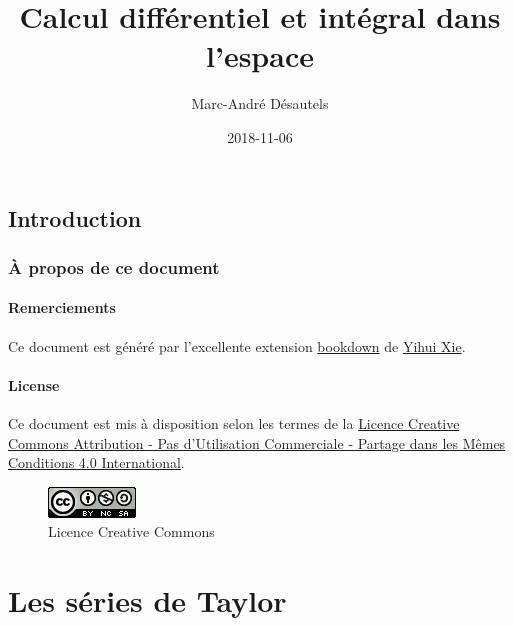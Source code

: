 \documentclass[]{book}
\title{Calcul différentiel et intégral dans l'espace}
\author{Marc-André Désautels}
\date{2018-11-06}
\theoremstyle{definition}
\theoremstyle{definition}
\theoremstyle{definition}
\theoremstyle{remark}
\begin{document}
\maketitle

{
\setcounter{tocdepth}{2}
\tableofcontents
}
\hypertarget{introduction}{%
\chapter*{Introduction}\label{introduction}}

\hypertarget{a-propos-de-ce-document}{%
\section*{À propos de ce document}\label{a-propos-de-ce-document}}

\hypertarget{remerciements}{%
\subsection*{Remerciements}\label{remerciements}}

Ce document est généré par l'excellente extension
\href{https://bookdown.org/}{bookdown} de
\href{https://yihui.name/}{Yihui Xie}.

\hypertarget{license}{%
\subsection*{License}\label{license}}

Ce document est mis à disposition selon les termes de la
\href{http://creativecommons.org/licenses/by-nc-sa/4.0/}{Licence
Creative Commons Attribution - Pas d'Utilisation Commerciale - Partage
dans les Mêmes Conditions 4.0 International}.

\begin{figure}
\centering
\includegraphics{resources/icons/license_cc.png}
\caption{Licence Creative Commons}
\end{figure}

\hypertarget{part-les-series-de-taylor}{%
\part{Les séries de Taylor}\label{part-les-series-de-taylor}}
\end{document}

